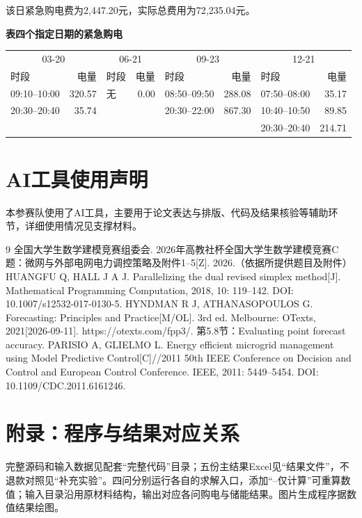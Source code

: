 \documentclass[12pt,a4paper]{ctexart}
\newcommand{\papertable}[1]{\refstepcounter{table}\label{tab:\thetable}\textbf{表\thetable\quad #1}}
\begin{document}
该日紧急购电费为2,447.20元，实际总费用为72,235.04元。

\par\addvspace{6pt}\noindent\begin{minipage}{\linewidth}\centering\scriptsize\papertable{四个指定日期的紧急购电}\par\vspace{4pt}
\begin{tabular}{lrlrlrlr}\toprule

\multicolumn{2}{c}{03-20} & \multicolumn{2}{c}{06-21} & \multicolumn{2}{c}{09-23} & \multicolumn{2}{c}{12-21} \\

时段 & 电量 & 时段 & 电量 & 时段 & 电量 & 时段 & 电量 \\ \midrule

09:10--10:00 & 320.57 & 无 & 0.00 & 08:50--09:50 & 288.08 & 07:50--08:00 & 35.17 \\
20:30--20:40 & 35.74 &  &  & 20:30--22:00 & 867.30 & 10:40--10:50 & 89.85 \\
 &  &  &  &  &  & 20:30--20:40 & 214.71 \\

\bottomrule\end{tabular}\end{minipage}\par\addvspace{6pt}


\section*{AI工具使用声明}
本参赛队使用了AI工具，主要用于论文表达与排版、代码及结果核验等辅助环节，详细使用情况见支撑材料。
\begin{thebibliography}{9}
 全国大学生数学建模竞赛组委会. 2026年高教社杯全国大学生数学建模竞赛C题：微网与外部电网电力调控策略及附件1--5[Z]. 2026.（依据所提供题目及附件）
 HUANGFU Q, HALL J A J. Parallelizing the dual revised simplex method[J]. Mathematical Programming Computation, 2018, 10: 119--142. DOI: 10.1007/s12532-017-0130-5.
 HYNDMAN R J, ATHANASOPOULOS G. Forecasting: Principles and Practice[M/OL]. 3rd ed. Melbourne: OTexts, 2021[2026-09-11]. https://otexts.com/fpp3/. 第5.8节：Evaluating point forecast accuracy.
 PARISIO A, GLIELMO L. Energy efficient microgrid management using Model Predictive Control[C]//2011 50th IEEE Conference on Decision and Control and European Control Conference. IEEE, 2011: 5449--5454. DOI: 10.1109/CDC.2011.6161246.
\end{thebibliography}

\section*{附录：程序与结果对应关系}
完整源码和输入数据见配套“完整代码”目录；五份主结果Excel见“结果文件”，不退款对照见“补充实验”。四问分别运行各自的求解入口，添加“--仅计算”可重算数值；输入目录沿用原材料结构，输出对应各问购电与储能结果。图片生成程序据数值结果绘图。
\end{document}
